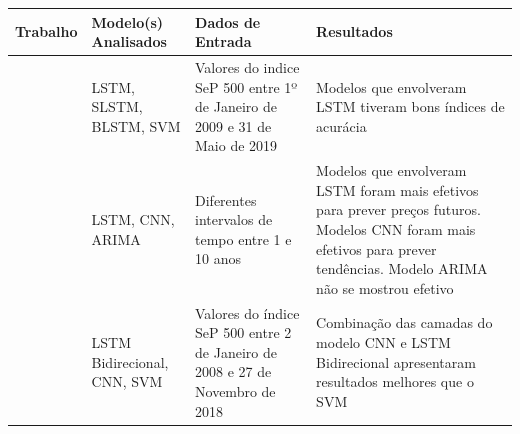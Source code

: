 \begin{center}
\begin{tabular}{||m{5em} m{4cm} m{4cm} m{4cm}||}
     \hline
     Trabalho & Modelo(s) Analisados & Dados de Entrada & Resultados \\ [0.5ex]
     \hline\hline
     \cite{Obthong2020} & LSTM, SLSTM, BLSTM, SVM & Valores do indice SeP 500 entre 1º de Janeiro de 2009 e 31 de Maio de 2019 & Modelos que envolveram LSTM tiveram bons índices de acurácia \\
     \hline
     \cite{Shah2022} & LSTM, CNN, ARIMA & Diferentes intervalos de tempo entre 1 e 10 anos & Modelos que envolveram LSTM foram mais efetivos para prever preços futuros. Modelos CNN foram mais efetivos para prever tendências. Modelo ARIMA não se mostrou efetivo \\
     \hline
     \cite{Eapen2019} & LSTM Bidirecional, CNN, SVM & Valores do índice SeP 500 entre 2 de Janeiro de 2008 e 27 de Novembro de 2018 & Combinação das camadas do modelo CNN e LSTM Bidirecional apresentaram resultados melhores que o SVM \\ [1ex]
     \hline
    
\end{tabular}
    
\end{center} 